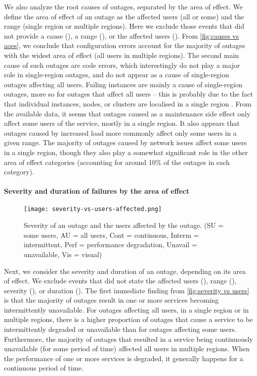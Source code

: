 We also analyze the root causes of outages, separated by the area of effect.
We define the area of effect of an outage as the affected users (all or some) and the range (single region or multiple regions).
Here we exclude those events that did not provide a cause (), a range (), or the affected users ().
From \autoref{fig:causes vs aoes}, we conclude that configuration errors account for the majority of outages with the widest area of effect (all users in multiple regions).
The second main cause of such outages are code errors, which interestingly do not play a major role in single-region outages, and do not appear as a cause of single-region outages affecting all users.
Failing instances are mainly a cause of single-region outages, more so for outages that affect all users -- this is probably due to the fact that individual instances, nodes, or clusters are localised in a single region \cite{awsRegionDocs}.
From the available data, it seems that outages caused as a maintenance side effect only affect some users of the service, mostly in a single region.
It also appears that outages caused by increased load more commonly affect only some users in a given range.
The majority of outages caused by network issues affect some users in a single region, though they also play a somewhat significant role in the other area of effect categories (accounting for around 10\% of the outages in each category).

\paragraph{Severity and duration of failures by the area of effect}
\begin{figure}
  \centering
  \texttt{[image: severity-vs-users-affected.png]}
  \caption{Severity of an outage and the users affected by the outage. (SU = some users, AU = all users, Cont = continuous, Interm = intermittent, Perf = performance degradation, Unavail = unavailable, Vis = visual)}
  \label{fig:severity vs users}
\end{figure}

Next, we consider the severity and duration of an outage, depending on its area of effect.
We exclude events that did not state the affected users (), range (), severity (), or duration ().
The first immediate finding from \autoref{fig:severity vs users} is that the majority of outages result in one or more services becoming intermittently unavailable.
For outages affecting all users, in a single region or in multiple regions, there is a higher proportion of outages that cause a service to be intermittently degraded or unavailable than for outages affecting some users.
Furthermore, the majority of outages that resulted in a service being continuously unavailable (for some period of time) affected all users in multiple regions.
When the performance of one or more services is degraded, it generally happens for a continuous period of time.

